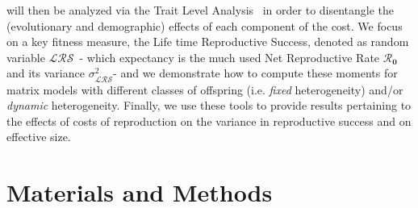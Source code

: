 \documentclass[10pt,a4paper]{article}
\newcommand{\Rzero}{$\boldsymbol{\mathcal{R}_{0}}$  }
\newcommand{\LRO}{$\mathcal{LRS}$}
\newcommand{\TLA}{Trait Level Analysis}
\newcommand{\vLRO}{$\sigma_{\mathrm{\mathcal{LRS}}}^2$}
\begin{document}
will then be analyzed via the \TLA\ %
in order to disentangle the (evolutionary and demographic) effects of each component of the cost.%
We focus on a key fitness measure, the Life time Reproductive Success, denoted as random variable \LRO\ - which expectancy is the much used Net Reproductive Rate \Rzero and its variance \vLRO - and we demonstrate how to compute these moments for matrix models with different classes of offspring (i.e. \emph{fixed }heterogeneity) and/or \emph{dynamic} heterogeneity.%
Finally, we use these tools to provide results pertaining to the effects of costs of reproduction on %
the variance in reproductive success and on effective size.


 






 
\newpage

\section{Materials and Methods}
\end{document}

